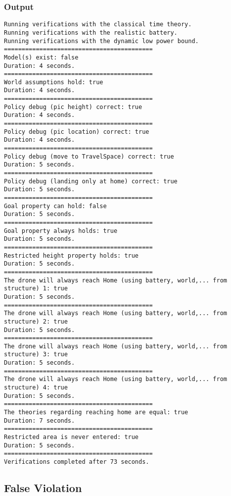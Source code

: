 \documentclass[12pt]{extarticle}
\begin{document}
\subsubsection*{Output}
\begin{lstlisting}[basicstyle=\tiny]
Running verifications with the classical time theory.
Running verifications with the realistic battery.
Running verifications with the dynamic low power bound.
==========================================
Model(s) exist: false
Duration: 4 seconds.
==========================================
World assumptions hold: true
Duration: 4 seconds.
==========================================
Policy debug (pic height) correct: true
Duration: 4 seconds.
==========================================
Policy debug (pic location) correct: true
Duration: 4 seconds.
==========================================
Policy debug (move to TravelSpace) correct: true
Duration: 5 seconds.
==========================================
Policy debug (landing only at home) correct: true
Duration: 5 seconds.
==========================================
Goal property can hold: false
Duration: 5 seconds.
==========================================
Goal property always holds: true
Duration: 5 seconds.
==========================================
Restricted height property holds: true
Duration: 5 seconds.
==========================================
The drone will always reach Home (using battery, world,... from structure) 1: true
Duration: 5 seconds.
==========================================
The drone will always reach Home (using battery, world,... from structure) 2: true
Duration: 5 seconds.
==========================================
The drone will always reach Home (using battery, world,... from structure) 3: true
Duration: 5 seconds.
==========================================
The drone will always reach Home (using battery, world,... from structure) 4: true
Duration: 5 seconds.
==========================================
The theories regarding reaching home are equal: true
Duration: 7 seconds.
==========================================
Restricted area is never entered: true
Duration: 5 seconds.
==========================================
Verifications completed after 73 seconds.
\end{lstlisting}

\subsection{False Violation}
\label{app:worldassumptionsfalseviolation}
\end{document}
